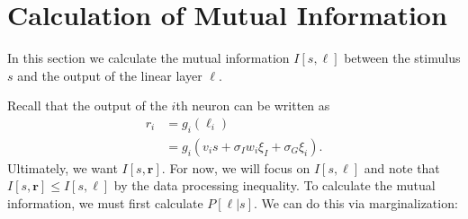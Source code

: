 \documentclass[11pt]{article}
\begin{document}
	\section{Calculation of Mutual Information}
	In this section we calculate the mutual information $I[s,\boldsymbol{\ell}]$ between the stimulus $s$ and the output of the linear layer $\boldsymbol{\ell}$. 
	
	Recall that the output of the $i$th neuron can be written as 
	\begin{align}
	r_i &= g_i(\ell_i) \\
	&= g_i(v_i s + \sigma_I w_i \xi_I + \sigma_G\xi_i).
	\end{align}
	Ultimately, we want $I[s, \mathbf{r}]$. For now, we will focus on $I[s, \boldsymbol{\ell}]$ and note that $I[s,\mathbf{r}] \leq I[s, \boldsymbol{\ell}]$ by the data processing inequality. To calculate the mutual information, we must first calculate $P[\boldsymbol{\ell}|s]$. We can do this via marginalization:
\end{document}
